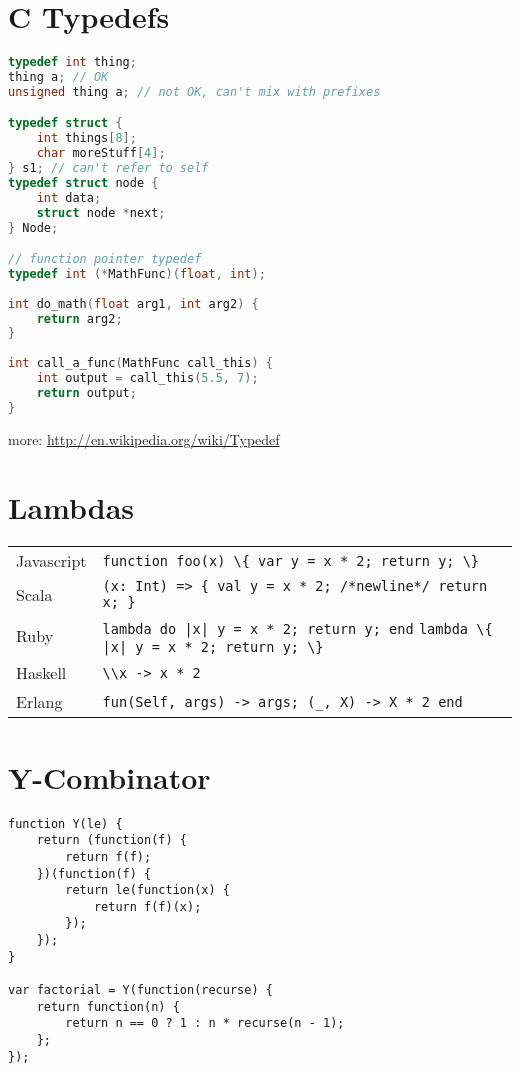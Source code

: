 \documentclass{article}
\begin{document}
\section{C Typedefs}
\begin{lstlisting}[language=C]
typedef int thing;
thing a; // OK
unsigned thing a; // not OK, can't mix with prefixes

typedef struct {
	int things[8];
	char moreStuff[4];
} s1; // can't refer to self
typedef struct node {
	int data;
	struct node *next;
} Node;

// function pointer typedef
typedef int (*MathFunc)(float, int);
 
int do_math(float arg1, int arg2) {
    return arg2;
}
 
int call_a_func(MathFunc call_this) {
    int output = call_this(5.5, 7);
    return output;
}
\end{lstlisting}
more: \url{http://en.wikipedia.org/wiki/Typedef}

\section{Lambdas}
\begin{longtabu} to 0.75\linewidth { X X }
	Javascript & \lstinline$function foo(x) \{ var y = x * 2; return y; \}$ \\
	Scala & \lstinline$(x: Int) => { val y = x * 2; /*newline*/ return x; }$ \\
	Ruby & \lstinline$lambda do |x| y = x * 2; return y; end$ \newline \lstinline$lambda \{ |x| y = x * 2; return y; \}$ \\
	Haskell & \lstinline$\\x -> x * 2$ \\
	Erlang & \lstinline$fun(Self, args) -> args; (_, X) -> X * 2 end$ \\
\end{longtabu}

\section{Y-Combinator}
\begin{lstlisting}
function Y(le) {
    return (function(f) {
        return f(f);
    })(function(f) {
        return le(function(x) {
            return f(f)(x);
        });
    });
}

var factorial = Y(function(recurse) {
    return function(n) {
        return n == 0 ? 1 : n * recurse(n - 1);
    };
});
\end{lstlisting}
\end{document}
